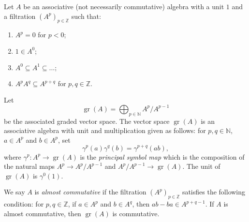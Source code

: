 \documentclass[a4paper, 12pt, reqno]{amsart}
\theoremstyle{remark}
\numberwithin{equation}{subsection}
\DeclareMathOperator{\gr}{gr}
\begin{document}
Let $A$ be an associative (not necessarily commutative) algebra with a unit $1$ and a filtration $(A^p)_{p \in \mathbb{Z}}$ such that:
\begin{enumerate}
\item $A^p = 0$ for $p < 0$;
\item $1 \in A^0$;
\item $A^0 \subseteq A^1 \subseteq \dots$;
\item $A^pA^q \subseteq A^{p + q}$ for $p, q \in \mathbb{Z}$.
\end{enumerate}
Let
\begin{equation*}
  \gr(A) = \bigoplus_{p \in \mathbb{N}}A^p/A^{p - 1}
\end{equation*}
be the associated graded vector space.
The vector space $\gr(A)$ is an associative algebra with unit and multiplication given as follows: for $p, q \in \mathbb{N}$, $a \in A^p$ and $b \in A^p$, set
\begin{equation*}
  \gamma^p(a)\gamma^q(b) = \gamma^{p + q}(ab),
\end{equation*}
where $\gamma^p: A^p \to \gr(A)$  is the \emph{principal symbol map} which is the composition of the natural maps $A^p \to A^p/A^{p - 1}$ and $A^p/A^{p - 1} \to \gr(A)$.
The unit of $\gr(A)$ is $\gamma^0(1)$.

We say $A$ is \emph{almost commutative} if the filtration $(A^p)_{p \in \mathbb{Z}}$ satisfies the following condition: for $p, q \in \mathbb{Z}$, if $a \in A^p$ and $b \in A^q$, then $ab - ba \in A^{p + q - 1}$.
If $A$ is almost commutative, then $\gr(A)$ is commutative.
\end{document}
